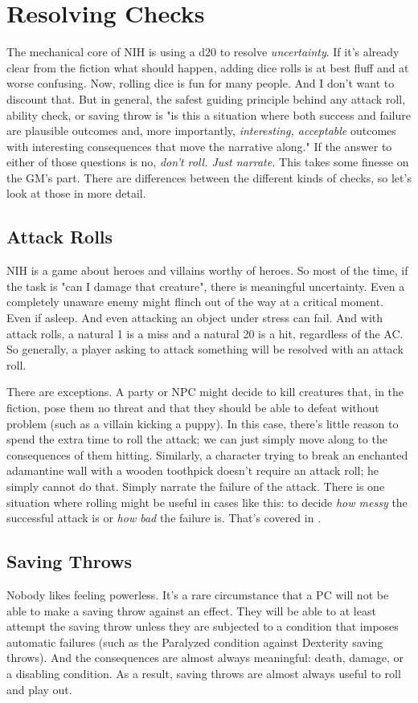 \documentclass[10pt,twoside,openany,bg=none]{dndbook}
\makeatletter
\newcommand{\smartnameref}[2]{%
    \@ifundefined{r@#1}%
      {#2}%
      {\nameref{#1}}%
}
\makeatother
\begin{document}
\section{Resolving Checks}\label{sec:resolving-checks}
The mechanical core of NIH is using a d20 to resolve \textit{uncertainty}. If it's already clear from the fiction what should happen, adding dice rolls is at best fluff and at worse confusing. Now, rolling dice is fun for many people. And I don't want to discount that. But in general, the safest guiding principle behind any attack roll, ability check, or saving throw is "is this a situation where both success and failure are plausible outcomes and, more importantly, \textit{interesting, acceptable} outcomes with interesting consequences that move the narrative along." If the answer to either of those questions is no, \textit{don't roll. Just narrate.} This takes some finesse on the GM's part. There are differences between the different kinds of checks, so let's look at those in more detail.

\subsection{Attack Rolls}
NIH is a game about heroes and villains worthy of heroes. So most of the time, if the task is "can I damage that creature", there is meaningful uncertainty. Even a completely unaware enemy might flinch out of the way at a critical moment. Even if asleep. And even attacking an object under stress can fail. And with attack rolls, a natural 1 is a miss and a natural 20 is a hit, regardless of the AC. So generally, a player asking to attack something will be resolved with an attack roll.

There are exceptions. A party or NPC might decide to kill creatures that, in the fiction, pose them no threat and that they should be able to defeat without problem (such as a villain kicking a puppy). In this case, there's little reason to spend the extra time to roll the attack; we can just simply move along to the consequences of them hitting. Similarly, a character trying to break an enchanted adamantine wall with a wooden toothpick doesn't require an attack roll; he simply cannot do that. Simply narrate the failure of the attack. There is one situation where rolling might be useful in cases like this: to decide \textit{how messy} the successful attack is or \textit{how bad} the failure is. That's covered in .

\subsection{Saving Throws}
Nobody likes feeling powerless. It's a rare circumstance that a PC will not be able to make a saving throw against an effect. They will be able to at least attempt the saving throw unless they are subjected to a condition that imposes automatic failures (such as \smartnameref{condition:paralyzed}{the Paralyzed condition} against Dexterity saving throws). And the consequences are almost always meaningful: death, damage, or a disabling condition. As a result, saving throws are almost always useful to roll and play out.
\end{document}
